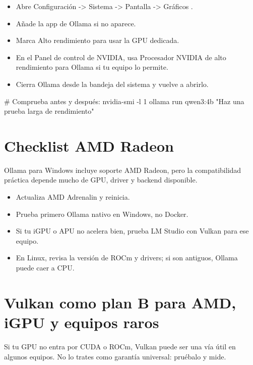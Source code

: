 \documentclass[11pt,a4paper]{book}
\begin{document}
\begin{itemize}\item Abre Configuración -> Sistema -> Pantalla -> Gráficos .\end{itemize}
\begin{itemize}\item Añade la app de Ollama si no aparece.\end{itemize}
\begin{itemize}\item Marca Alto rendimiento para usar la GPU dedicada.\end{itemize}
\begin{itemize}\item En el Panel de control de NVIDIA, usa Procesador NVIDIA de alto rendimiento para Ollama si tu equipo lo permite.\end{itemize}
\begin{itemize}\item Cierra Ollama desde la bandeja del sistema y vuelve a abrirlo.\end{itemize}
\begin{codebox}
# Comprueba antes y después:
nvidia-smi -l 1
ollama run qwen3:4b "Haz una prueba larga de rendimiento"
\end{codebox}
\section{Checklist AMD Radeon}
Ollama para Windows incluye soporte AMD Radeon, pero la compatibilidad práctica depende mucho de GPU, driver y backend disponible.

\begin{itemize}\item Actualiza AMD Adrenalin y reinicia.\end{itemize}
\begin{itemize}\item Prueba primero Ollama nativo en Windows, no Docker.\end{itemize}
\begin{itemize}\item Si tu iGPU o APU no acelera bien, prueba LM Studio con Vulkan para ese equipo.\end{itemize}
\begin{itemize}\item En Linux, revisa la versión de ROCm y drivers; si son antiguos, Ollama puede caer a CPU.\end{itemize}
\section{Vulkan como plan B para AMD, iGPU y equipos raros}
Si tu GPU no entra por CUDA o ROCm, Vulkan puede ser una vía útil en algunos equipos. No lo trates como garantía universal: pruébalo y mide.
\end{document}
